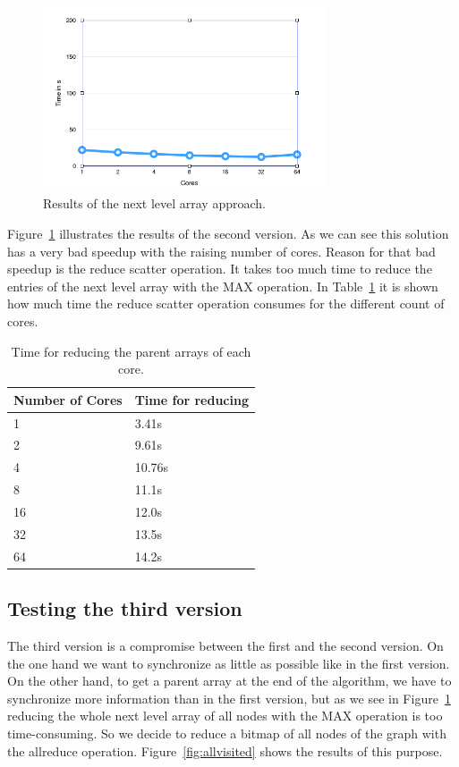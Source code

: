 \documentclass[12pt,a4paper]{article}
\begin{document}
\begin{figure}[!ht]
   \centering
   \includegraphics[width=0.75\textwidth]{parent_array}
   \caption{Results of the next level array approach.}
   \label{fig:parentarray}
\end{figure}

Figure~\ref{fig:parentarray} illustrates the results of the second version. As we can see this solution has a very bad speedup with the raising number of cores. Reason for that bad speedup is the reduce scatter operation. It takes too much time to reduce the entries of the next level array with the MAX operation. In Table~\ref{tab:reducescatter} it is shown how much time the reduce scatter operation consumes for the different count of cores.

\begin{table}[!ht]
	\centering
	\begin{tabular}{ | l | l |}
  		\hline
  		Number of Cores & Time for reducing \\ \hline
  		1 & 3.41s \\ \hline
		2 & 9.61s \\ \hline
		4 & 10.76s \\ \hline
		8 & 11.1s \\ \hline
		16 & 12.0s \\ \hline
		32 & 13.5s \\ \hline
		64 & 14.2s \\ \hline
	\end{tabular}
	\caption{Time for reducing the parent arrays of each core.}
  	\label{tab:reducescatter}
\end{table}

\subsection{Testing the third version}

The third version is a compromise between the first and the second version. On the one hand we want to synchronize as little as possible like in the first version. On the other hand, to get a parent array at the end of the algorithm, we have to synchronize more information than in the first version, but as we see in Figure~\ref{fig:parentarray} reducing the whole next level array of all nodes with the MAX operation is too time-consuming. So we decide to reduce a bitmap of all nodes of the graph with the allreduce operation. Figure~\ref{fig:allvisited} shows the results of this purpose.
\end{document}
